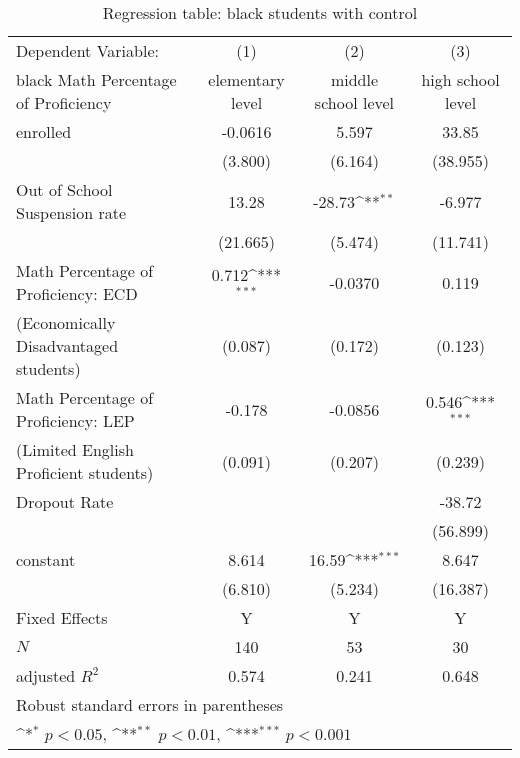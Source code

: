 \begin{table}[H]\centering
\def\sym#1{\ifmmode^{#1}\else\(^{#1}\)\fi}
\caption{Regression table: black students with control\label{tab1}}
\begin{tabular}{l*{3}{c}}
\hline\hline
  Dependent Variable: &\multicolumn{1}{c}{(1)}&\multicolumn{1}{c}{(2)}&\multicolumn{1}{c}{(3)}\\
black Math Percentage of Proficiency            &\multicolumn{1}{c}{elementary level}&\multicolumn{1}{c}{middle school level}&\multicolumn{1}{c}{high school level}\\
\hline
enrolled    &      -0.0616         &       5.597         &      33.85 \\
            &     (3.800)         &     (6.164)         &     (38.955)         \\
[1em]
Out of School Suspension rate&      13.28         &      -28.73\sym{**} &      -6.977         \\
            &     (21.665)         &     (5.474)         &     (11.741)         \\
[1em]
Math Percentage of Proficiency: ECD&       0.712\sym{***}&       -0.0370         &       0.119 \\
(Economically Disadvantaged students) &    (0.087)         &     (0.172)         &     (0.123)         \\
[1em]
Math Percentage of Proficiency: LEP&     -0.178         &      -0.0856         &       0.546\sym{***}    \\
(Limited English Proficient students)   &    (0.091)         &     (0.207)         &     (0.239)         \\
[1em]
Dropout Rate&              &       &      -38.72      \\
            &             &             &     (56.899)         \\
[1em]
constant      &       8.614&       16.59\sym{***}&       8.647\\
            &     (6.810)         &     (5.234)         &     (16.387)         \\
\hline
Fixed Effects   &    Y     &Y&Y \\
\hline
\(N\)       &         140         &          53         &          30         \\
adjusted \(R^{2}\)&       0.574         &       0.241         &       0.648         \\
\hline\hline
\multicolumn{4}{l}{\footnotesize Robust standard errors in parentheses}\\
\multicolumn{4}{l}{\footnotesize \sym{*} \(p<0.05\), \sym{**} \(p<0.01\), \sym{***} \(p<0.001\)}\\
\end{tabular}
\end{table}

